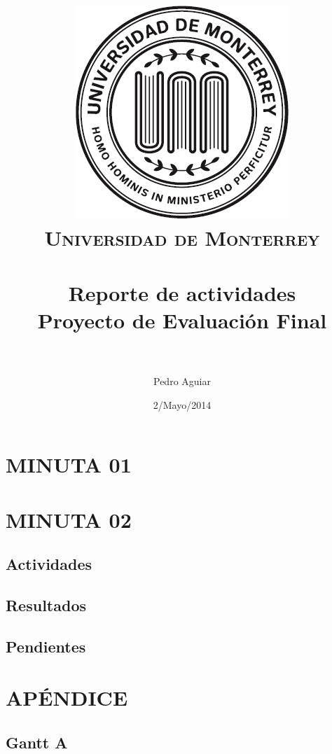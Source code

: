\documentclass[paper=A4, fontsize=11pt, titlepage]{article}
\title{
\includegraphics[height=0.35\textwidth]{fig/udemlogo}\\
\normalfont \normalsize 
\textsc{Universidad de Monterrey} \\ [25pt] 
\horrule{1pt} \\[0.4cm]
\huge Reporte de actividades \\ 
\small Proyecto de Evaluación Final \\
\horrule{2pt} \\[0.5cm]
}
\author{Pedro Aguiar}
\date{\normalsize 2/Mayo/2014}
\numberwithin{equation}{section}
\numberwithin{figure}{section}
\numberwithin{table}{section}
\newcommand*{\sectionpostamble}{}
\newcommand*{\fromto}[1]{\def\sectionpostamble{#1}}
\begin{document}
\maketitle
\tableofcontents
\clearpage
\listoffigures
\listoftables
\clearpage


\fromto{23 de Abril - 2 de Mayo}
\section{MINUTA 01}





\clearpage


\fromto{5 de Mayo - 9 de Mayo}
\section{MINUTA 02}

\subsection{Actividades}
\subsection{Resultados}
\subsection{Pendientes}
\clearpage

\section{APÉNDICE}
\subsection{Gantt A}

\end{document}
